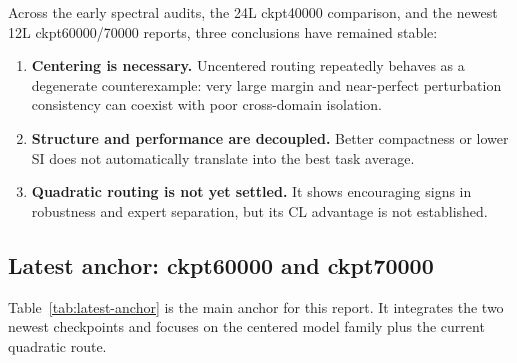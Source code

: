 \documentclass[11pt]{article}
\begin{document}
Across the early spectral audits, the 24L ckpt40000 comparison, and the newest 12L ckpt60000/70000 reports, three conclusions have remained stable:
\begin{enumerate}
    \item \textbf{Centering is necessary.} Uncentered routing repeatedly behaves as a degenerate counterexample: very large margin and near-perfect perturbation consistency can coexist with poor cross-domain isolation.
    \item \textbf{Structure and performance are decoupled.} Better compactness or lower SI does not automatically translate into the best task average.
    \item \textbf{Quadratic routing is not yet settled.} It shows encouraging signs in robustness and expert separation, but its CL advantage is not established.
\end{enumerate}

\subsection{Latest anchor: ckpt60000 and ckpt70000}

Table~\ref{tab:latest-anchor} is the main anchor for this report. It integrates the two newest checkpoints and focuses on the centered model family plus the current quadratic route.
\end{document}

